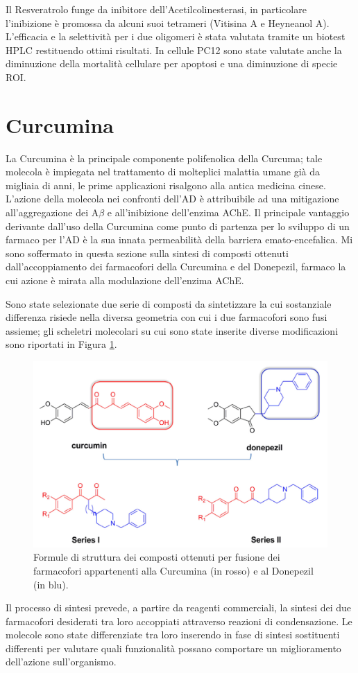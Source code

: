 \documentclass[a4paper, 11pt]{article}
\begin{document}
Il Resveratrolo funge da inibitore dell'Acetilcolinesterasi, in particolare l'inibizione è promossa da alcuni suoi tetrameri (Vitisina A e Heyneanol A). L'efficacia e la selettività per i due oligomeri è stata valutata tramite un biotest HPLC restituendo ottimi risultati. In cellule PC12 sono state valutate anche la diminuzione della mortalità cellulare per apoptosi e una diminuzione di specie ROI.

\section{Curcumina}
La Curcumina è la principale componente polifenolica della Curcuma; tale molecola è impiegata nel trattamento di molteplici malattia umane già da migliaia di anni, le prime applicazioni risalgono alla antica medicina cinese.  L'azione della molecola nei confronti dell'AD è attribuibile ad una mitigazione all'aggregazione dei A$\beta$ e all'inibizione dell'enzima AChE. Il principale vantaggio derivante dall'uso della Curcumina come punto di partenza per lo sviluppo di un farmaco per l'AD è la sua innata permeabilità della barriera emato-encefalica. Mi sono soffermato in questa sezione sulla sintesi di composti ottenuti dall'accoppiamento dei farmacofori della Curcumina e del Donepezil, farmaco la cui azione è mirata alla modulazione dell'enzima AChE.

Sono state selezionate due serie di composti da sintetizzare la cui sostanziale differenza risiede nella diversa geometria con cui i due farmacofori sono fusi assieme; gli scheletri molecolari su cui sono state inserite diverse modificazioni sono riportati in Figura \ref{fig:generale_curcdone}.
\begin{figure}[H]
	\centering
	\includegraphics[width=.5\linewidth]{immagini/generale_curcdone.png}
	\caption{Formule di struttura dei composti ottenuti per fusione dei farmacofori appartenenti alla Curcumina (in rosso) e al Donepezil (in blu).}
	\label{fig:generale_curcdone}
\end{figure}

Il processo di sintesi prevede, a partire da reagenti commerciali, la sintesi dei due farmacofori desiderati tra loro accoppiati attraverso reazioni di condensazione. Le molecole sono state differenziate tra loro inserendo in fase di sintesi sostituenti differenti per valutare quali funzionalità possano comportare un miglioramento dell'azione sull'organismo.
\end{document}
